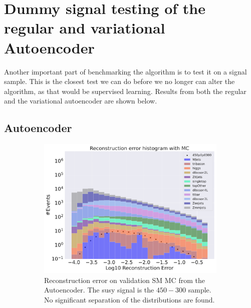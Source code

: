 \section{Dummy signal testing of the regular and variational Autoencoder}

Another important part of benchmarking the algorithm is to test it on a signal sample. This is the closest test we can do before
we no longer can alter the algorithm, as that would be supervised learning. Results from both the regular and the variational autoencoder 
are shown below. 

\subsection*{Autoencoder}

\begin{figure}[h!]
    \centering
    \begin{subfigure}{.45\textwidth}
        \includegraphics[width=\textwidth]{Figures/AE_testing/small/b_data_recon_big_rm3_feats_sig_450p0p0300.pdf}
        \caption{Reconstruction error on validation SM MC from the Autoencoder. The susy signal is the $450-300$ sample. 
        No significant separation of the distributions are found. }
        \label{fig:ae_susy_450_300_recon}
    \end{subfigure}
    \hfill
    \begin{subfigure}{.45\textwidth}

\end{subfigure}
\end{figure}
